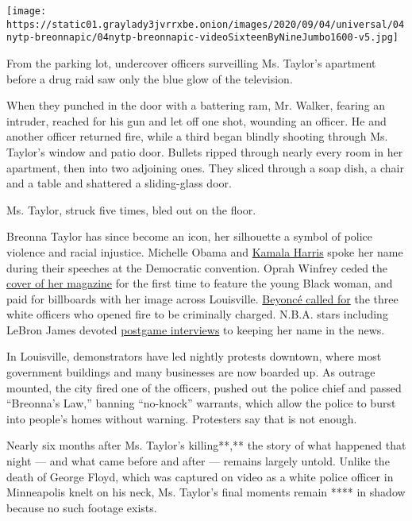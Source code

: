 \texttt{[image: https://static01.graylady3jvrrxbe.onion/images/2020/09/04/universal/04nytp-breonnapic/04nytp-breonnapic-videoSixteenByNineJumbo1600-v5.jpg]}

From the parking lot, undercover officers surveilling Ms. Taylor's
apartment before a drug raid saw only the blue glow of the television.

When they punched in the door with a battering ram, Mr. Walker, fearing
an intruder, reached for his gun and let off one shot, wounding an
officer. He and another officer returned fire, while a third began
blindly shooting through Ms. Taylor's window and patio door. Bullets
ripped through nearly every room in her apartment, then into two
adjoining ones. They sliced through a soap dish, a chair and a table and
shattered a sliding-glass door.

Ms. Taylor, struck five times, bled out on the floor.

Breonna Taylor has since become an icon, her silhouette a symbol of
police violence and racial injustice. Michelle Obama and
\href{https://www.courier-journal.com/story/news/local/breonna-taylor/2020/08/19/dnc-2020-hillary-clinton-name-drops-breonna-taylor-george-floyd/5613797002/}{Kamala
Harris} spoke her name during their speeches at the Democratic
convention. Oprah Winfrey ceded the
\href{https://www.npr.org/2020/08/01/898099594/oprahs-o-magazine-honors-breonna-taylor-in-historic-cover}{cover
of her magazine} for the first time to feature the young Black woman,
and paid for billboards with her image across Louisville.
\href{https://www.beyonce.com/image/letter-to-attorney-general-daniel-cameron/}{Beyoncé
called for} the three white officers who opened fire to be criminally
charged. N.B.A. stars including LeBron James devoted
\href{https://www.cnn.com/2020/07/24/us/nba-breonna-taylor-spt-trnd/index.html}{postgame
interviews} to keeping her name in the news.

In Louisville, demonstrators have led nightly protests downtown, where
most government buildings and many businesses are now boarded up. As
outrage mounted, the city fired one of the officers, pushed out the
police chief and passed ``Breonna's Law,'' banning ``no-knock''
warrants, which allow the police to burst into people's homes without
warning. Protesters say that is not enough.

Nearly six months after Ms. Taylor's killing**,** the story of what
happened that night --- and what came before and after --- remains
largely untold. Unlike the death of George Floyd, which was captured on
video as a white police officer in Minneapolis knelt on his neck, Ms.
Taylor's final moments remain **** in shadow because no such footage
exists.

